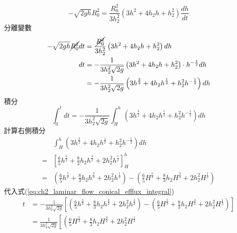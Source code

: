 \documentclass[../main.tex]{subfiles}
\begin{document}
\begin{itemize}
\begin{itemize}
      \begin{equation}
        - \sqrt{2gh} R_0^2 = \frac{R_0^2}{3 h_2^2} \left(
          3h^2 + 4h_2 h + h_2^2
        \right) \frac{dh}{dt}
      \end{equation}
      分離變數
      \begin{align}
        -\sqrt{2gh}\cancel{R_0^2} dt &= \frac{\cancel{R_0^2}}{3 h_2^2} \left(
          3h^2 + 4h_2 h + h_2^2
        \right) dh \nonumber\\
        dt &= -\frac{1}{3 h_2^2 \sqrt{2g}} \left(
          3h^2 + 4h_2 h + h_2^2
        \right) \cdot h^{-\frac{1}{2}} dh \nonumber\\
        &= - \frac{1}{3 h_2^2 \sqrt{2g}} \left(
          3h^{\frac{3}{2}} + 4h_2 h^{\frac{1}{2}} + h_2^2 h^{-\frac{1}{2}}
        \right) dh
      \end{align}
      積分
      \begin{equation}
        \int_0^{t} dt = - \frac{1}{3 h_2^2 \sqrt{2g}} \int_H^{h} \left(
          3h^{\frac{3}{2}} + 4h_2 h^{\frac{1}{2}} + h_2^2 h^{-\frac{1}{2}}
        \right) dh \label{eq:ch2_laminar_flow_conical_efflux_integral}
      \end{equation}
      計算右側積分
      \begin{align}
        &\int_H^{h} \left(
          3h^{\frac{3}{2}} + 4h_2 h^{\frac{1}{2}} + h_2^2 h^{-\frac{1}{2}}
        \right) dh \nonumber \\
        =& \left[
          \frac{6}{5} h^{\frac{5}{2}} + \frac{8}{3} h_2 h^{\frac{3}{2}} + 2 h_2^2 h^{\frac{1}{2}}
        \right]_{H}^{h} \nonumber\\
        =& \left(
          \frac{6}{5} h^{\frac{5}{2}} + \frac{8}{3} h_2 h^{\frac{3}{2}} + 2 h_2^2 h^{\frac{1}{2}}
        \right) - \left(
          \frac{6}{5} H^{\frac{5}{2}} + \frac{8}{3} h_2 H^{\frac{3}{2}} + 2 h_2^2 H^{\frac{1}{2}}
        \right)
      \end{align}
      代入式(\ref{eq:ch2_laminar_flow_conical_efflux_integral})
      \begin{align}
        t &= - \frac{1}{3 h_2^2 \sqrt{2g}} \left[
          \left(
            \frac{6}{5} h^{\frac{5}{2}} + \frac{8}{3} h_2 h^{\frac{3}{2}} + 2 h_2^2 h^{\frac{1}{2}}
          \right) - \left(
            \frac{6}{5} H^{\frac{5}{2}} + \frac{8}{3} h_2 H^{\frac{3}{2}} + 2 h_2^2 H^{\frac{1}{2}}
          \right)
        \right] \nonumber\\
        &= \frac{1}{3 h_2^2 \sqrt{2g}} \left[
          \left(
            \frac{6}{5} H^{\frac{5}{2}} + \frac{8}{3} h_2 H^{\frac{3}{2}} + 2 h_2^2 H^{\frac{1}{2}}

\end{align}
\end{itemize}
\end{itemize}
\end{document}
